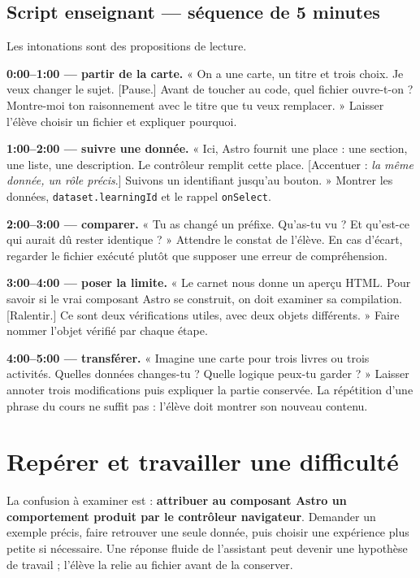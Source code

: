 \documentclass[
  canadien,
  11pt,
  a4paper,
]{report}
\begin{document}
\subsection{Script enseignant --- séquence de 5
minutes}\label{script-enseignant-suxe9quence-de-5-minutes-1}

Les intonations sont des propositions de lecture.

\textbf{0:00--1:00 --- partir de la carte.} « On a une carte, un titre
et trois choix. Je veux changer le sujet. {[}Pause.{]} Avant de toucher
au code, quel fichier ouvre-t-on ? Montre-moi ton raisonnement avec le
titre que tu veux remplacer. » Laisser l'élève choisir un fichier et
expliquer pourquoi.

\textbf{1:00--2:00 --- suivre une donnée.} « Ici, Astro fournit une
place : une section, une liste, une description. Le contrôleur remplit
cette place. {[}Accentuer : \emph{la même donnée, un rôle précis}.{]}
Suivons un identifiant jusqu'au bouton. » Montrer les données,
\texttt{dataset.learning\allowbreak{}Id} et le rappel \texttt{on\allowbreak{}Select}.

\textbf{2:00--3:00 --- comparer.} « Tu as changé un préfixe. Qu'as-tu vu
? Et qu'est-ce qui aurait dû rester identique ? » Attendre le constat de
l'élève. En cas d'écart, regarder le fichier exécuté plutôt que supposer
une erreur de compréhension.

\textbf{3:00--4:00 --- poser la limite.} « Le carnet nous donne un
aperçu HTML. Pour savoir si le vrai composant Astro se construit, on
doit examiner sa compilation. {[}Ralentir.{]} Ce sont deux vérifications
utiles, avec deux objets différents. » Faire nommer l'objet vérifié par
chaque étape.

\textbf{4:00--5:00 --- transférer.} « Imagine une carte pour trois
livres ou trois activités. Quelles données changes-tu ? Quelle logique
peux-tu garder ? » Laisser annoter trois modifications puis expliquer la
partie conservée. La répétition d'une phrase du cours ne suffit pas :
l'élève doit montrer son nouveau contenu.

\section{Repérer et travailler une
difficulté}\label{repuxe9rer-et-travailler-une-difficultuxe9-1}

La confusion à examiner est : \textbf{attribuer au composant Astro un
comportement produit par le contrôleur navigateur}. Demander un exemple
précis, faire retrouver une seule donnée, puis choisir une expérience
plus petite si nécessaire. Une réponse fluide de l'assistant peut
devenir une hypothèse de travail ; l'élève la relie au fichier avant de
la conserver.
\end{document}
